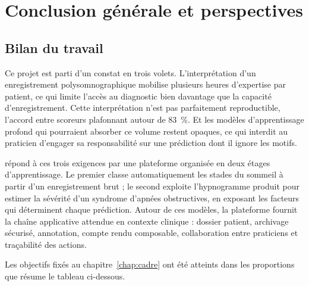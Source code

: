 \chapter*{Conclusion générale et perspectives}

\section*{Bilan du travail}

Ce projet est parti d'un constat en trois volets. L'interprétation d'un enregistrement
polysomnographique mobilise plusieurs heures d'expertise par patient, ce qui limite
l'accès au diagnostic bien davantage que la capacité d'enregistrement. Cette
interprétation n'est pas parfaitement reproductible, l'accord entre scoreurs
plafonnant autour de \SI{83}{\percent}. Et les modèles d'apprentissage profond qui
pourraient absorber ce volume restent opaques, ce qui interdit au praticien d'engager
sa responsabilité sur une prédiction dont il ignore les motifs.

\hypnoria{} répond à ces trois exigences par une plateforme organisée en deux étages
d'apprentissage. Le premier classe automatiquement les stades du sommeil à partir d'un
enregistrement brut ; le second exploite l'hypnogramme produit pour estimer la sévérité
d'un syndrome d'apnées obstructives, en exposant les facteurs qui déterminent chaque
prédiction. Autour de ces modèles, la plateforme fournit la chaîne applicative attendue
en contexte clinique : dossier patient, archivage sécurisé, annotation, compte rendu
composable, collaboration entre praticiens et traçabilité des actions.

Les objectifs fixés au chapitre~\ref{chap:cadre} ont été atteints dans les proportions
que résume le tableau ci-dessous.

